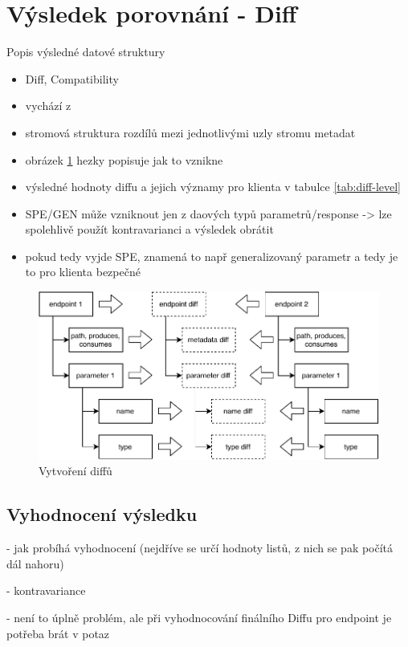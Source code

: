 \documentclass[czech,DP]{thesiskiv}
\begin{document}
	
\section{Výsledek porovnání - Diff}	
Popis výsledné datové struktury
\begin{itemize}
	\item Diff, Compatibility
	\item vychází z \cite{brada2006diff}
	\item stromová struktura rozdílů mezi jednotlivými uzly stromu metadat
	\item obrázek \ref{fig:diff-construction} hezky popisuje jak to vznikne
	\item výsledné hodnoty diffu a jejich významy pro klienta v tabulce \ref{tab:diff-level}
	\item SPE/GEN může vzniknout jen z daových typů parametrů/response -> lze spolehlivě použít kontravarianci a výsledek obrátit
	\item pokud tedy vyjde SPE, znamená to např generalizovaný parametr a tedy je to pro klienta bezpečné
\end{itemize}
	
\begin{figure}[h]
	\centering
	\includegraphics{diff-construction}
	\caption{Vytvoření diffů}
	\label{fig:diff-construction}
\end{figure}

\subsection{Vyhodnocení výsledku}

- jak probíhá vyhodnocení (nejdříve se určí hodnoty listů, z nich se pak počítá dál nahoru)

- kontravariance

	- není to úplně problém, ale při vyhodnocování finálního Diffu pro endpoint je potřeba brát v potaz 
	
\end{document}
